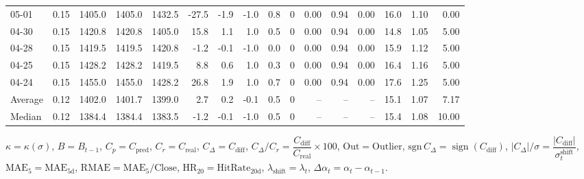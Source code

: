 \begin{threeparttable}
{\begin{tabular}{lrrrrrrrrrrrrrrr}
  05-01 &     0.15 & 1405.0 & 1405.0 & 1432.5 &      -27.5 &           -1.9 &                     -1.0 &                 0.8 &              0 &       0.00 &      0.94 &           0.00 &             16.0 &            1.10 &                   0.00 \\
  04-30 &     0.15 & 1420.8 & 1420.8 & 1405.0 &       15.8 &            1.1 &                      1.0 &                 0.5 &              0 &       0.00 &      0.94 &           0.00 &             14.8 &            1.05 &                   5.00 \\
  04-28 &     0.15 & 1419.5 & 1419.5 & 1420.8 &       -1.2 &           -0.1 &                     -1.0 &                 0.0 &              0 &       0.00 &      0.94 &           0.00 &             15.9 &            1.12 &                   5.00 \\
  04-25 &     0.15 & 1428.2 & 1428.2 & 1419.5 &        8.8 &            0.6 &                      1.0 &                 0.3 &              0 &       0.00 &      0.94 &           0.00 &             16.4 &            1.16 &                   5.00 \\
  04-24 &     0.15 & 1455.0 & 1455.0 & 1428.2 &       26.8 &            1.9 &                      1.0 &                 0.7 &              0 &       0.00 &      0.94 &           0.00 &             17.6 &            1.25 &                   5.00 \\
Average &     0.12 & 1402.0 & 1401.7 & 1399.0 &        2.7 &            0.2 &                     -0.1 &                 0.5 &              0 &         -- &        -- &             -- &             15.1 &            1.07 &                   7.17 \\
 Median &     0.12 & 1384.4 & 1384.4 & 1383.5 &       -1.2 &           -0.1 &                     -1.0 &                 0.5 &              0 &         -- &        -- &             -- &             15.4 &            1.08 &                  10.00 \\
\bottomrule
\end{tabular}
}
\begin{tablenotes}\footnotesize
\item $\kappa=\kappa(\sigma)$, $B=B_{t-1}$, $C_p=C_{\text{pred}}$, $C_r=C_{\text{real}}$, $C_\Delta=C_{\text{diff}}$, $C_\Delta/C_r=\dfrac{C_{\text{diff}}}{C_{\text{real}}}\times100$, $\mathrm{Out}=\text{Outlier}$, $\mathrm{sgn}\,C_\Delta=\operatorname{sign}(C_{\text{diff}})$, $|C_\Delta|/\sigma=\dfrac{|C_{\text{diff}}|}{\sigma_t^{\text{shift}}}$, $\mathrm{MAE}_5=\mathrm{MAE}_{5\text{d}}$, $\mathrm{RMAE}= \mathrm{MAE}_5 / \text{Close}$, $\mathrm{HR}_{20}=\mathrm{HitRate}_{20\text{d}}$, 
$\lambda_{\text{shift}}=\lambda_t$, 
$\Delta\alpha_t=\alpha_t-\alpha_{t-1}$.
\end{tablenotes}
\end{threeparttable}
\endgroup

